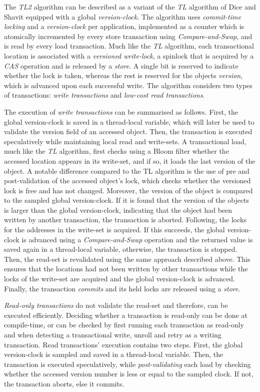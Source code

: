 The \textit{TL2} algorithm can be described as a variant of the \textit{TL} algorithm of Dice and Shavit\cite{tl} equipped with a global \textit{version-clock}. The algorithm uses \textit{commit-time locking} and a \textit{version-clock} per application, implemented as a counter which is atomically incremented by every store transaction using \textit{Compare-and-Swap}, and is read by every load transaction\cite{tl2}. Much like the \textit{TL} algorithm, each transactional location is associated with a \textit{versioned write-lock}, a spinlock that is acquired by a \textit{CAS} operation and is released by a \textit{store}. A single bit is reserved to indicate whether the lock is taken, whereas the rest is reserved for the objects \textit{version}, which is advanced upon each successful write\cite{tl2}. The algorithm considers two types of transactions: \textit{write transactions} and \textit{low-cost read transactions}\cite{tl2}.

The execution of \textit{write transactions} can be summarised as follows. First, the global version-clock is saved in a thread-local variable, which will later be used to validate the version field of an accessed object. Then, the transaction is executed speculatively while maintaining local read and write-sets. A transactional load, much like the \textit{TL} algorithm\cite{tl}, first checks using a Bloom filter whether the accessed location appears in its write-set, and if so, it loads the last version of the object. A notable difference compared to the TL algorithm is the use of pre and post-validation of the accessed object's lock, which checks whether the versioned lock is free and has not changed. Moreover, the version of the object is compared to the sampled global version-clock. If it is found that the version of the objects is larger than the global version-clock, indicating that the object had been written by another transaction, the transaction is aborted\cite{tl2}. Following, the locks for the addresses in the write-set is acquired. If this succeeds, the global version-clock is advanced using a \textit{Compare-and-Swap} operation and the returned value is saved again in a thread-local variable, otherwise, the transaction is stopped\cite{tl2}. Then, the read-set is revalidated using the same approach described above. This ensures that the locations had not been written by other transactions while the locks of the write-set are acquired and the global version-clock is advanced. Finally, the transaction \textit{commits} and its held locks are released using a \textit{store}\cite{tl2}.

\textit{Read-only transactions} do not validate the read-set and therefore, can be executed efficiently\cite{tl2}. Deciding whether a transaction is read-only can be done at compile-time, or can be checked by first running each transaction as read-only and when detecting a transactional write, unroll and retry as a writing transaction\cite{tl2}. Read transactions' execution contains two steps. First, the global version-clock is sampled and saved in a thread-local variable. Then, the transaction is executed speculatively, while \textit{post-validating} each load by checking whether the accessed version number is less or equal to the sampled clock. If not, the transaction aborts, else it commits\cite{tl2}.
